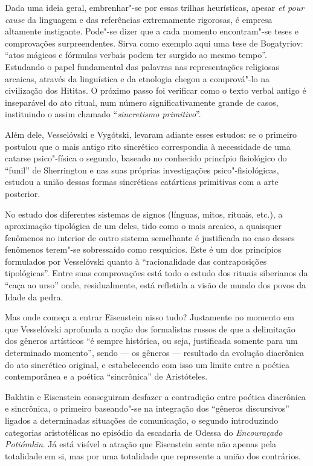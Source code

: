 Dada uma ideia geral, embrenhar"-se por essas trilhas heurísticas, apesar
\emph{et pour cause} da linguagem e das referências extremamente
rigorosas, é empresa altamente instigante. Pode"-se dizer que a cada
momento encontram"-se teses e comprovações surpreendentes. Sirva como
exemplo aqui uma tese de Bogatyriov: ``atos mágicos e fórmulas verbais
podem ter surgido ao mesmo tempo''. Estudando o papel fundamental das
palavras nas representações religiosas arcaicas, através da linguística
e da etnologia chegou a comprová"-lo na civilização dos Hititas. O
próximo passo foi verificar como o texto verbal antigo é inseparável do
ato ritual, num número significativamente grande de casos, instituindo o
assim chamado ``\emph{sincretismo primitivo}''.

Além dele, Vesselóvski e Vygótski, levaram adiante esses estudos: se o
primeiro postulou que o mais antigo rito sincrético correspondia à
necessidade de uma catarse psico"-física o segundo, baseado no conhecido
princípio fisiológico do ``funil'' de Sherrington e nas suas próprias
investigações psico"-fisiológicas, estudou a união dessas formas
sincréticas catárticas primitivas com a arte posterior.

No estudo dos diferentes sistemas de signos (línguas, mitos, rituais,
etc.), a aproximação tipológica de um deles, tido como o mais arcaico,
a quaisquer fenômenos no interior de outro sistema semelhante é
justificada no caso desses fenômenos terem"-se sobressaído como
resquícios. Este é um dos princípios formulados por Vesselóvski quanto à
``racionalidade das contraposições tipológicas''. Entre suas
comprovações está todo o estudo dos rituais siberianos da ``caça ao urso'' onde, residualmente, está refletida a visão de mundo
dos povos da Idade da pedra.

Mas onde começa a entrar Eisenstein nisso tudo? Justamente no momento em
que Vesselóvski aprofunda a noção dos formalistas russos de que a
delimitação dos gêneros artísticos ``é sempre histórica, ou seja,
justificada somente para um determinado momento'', sendo --- os gêneros ---
resultado da evolução diacrônica do ato sincrético original, e
estabelecendo com isso um limite entre a poética contemporânea e a
poética ``sincrônica'' de Aristóteles.

Bakhtin e Eisenstein conseguiram desfazer a contradição entre poética
diacrônica e sincrônica, o primeiro baseando"-se na integração dos
``gêneros discursivos'' ligados a determinadas situações de comunicação,
o segundo introduzindo categorias aristotélicas no episódio da escadaria
de Odessa do \emph{Encouraçado Potiómkin}. Já está visível a atração
que Eisenstein sente não apenas pela totalidade em si, mas por uma
totalidade que represente a união dos contrários.

